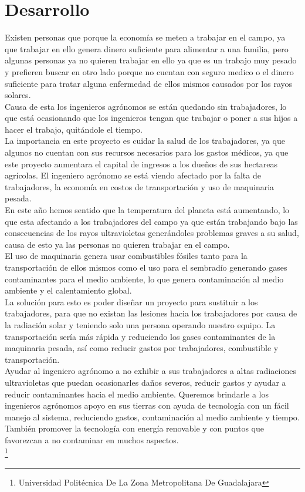 \documentclass[11pt,a4paper]{article}
\begin{document}
\section{Desarrollo}
Existen personas que porque la economía se meten a trabajar en el campo, ya que trabajar en ello genera dinero suficiente para alimentar a una familia, pero algunas personas ya no quieren trabajar en ello ya que es un trabajo muy pesado y prefieren buscar en otro lado porque no cuentan con seguro medico o el dinero suficiente para tratar alguna enfermedad de ellos mismos causados por los rayos solares.\\
Causa de esta los ingenieros agrónomos se están quedando sin trabajadores, lo que está ocasionando que los ingenieros tengan que trabajar o poner a sus hijos a hacer el trabajo, quitándole el tiempo.\\
La importancia en este proyecto es cuidar la salud de los trabajadores, ya que algunos no cuentan con sus recursos necesarios para los gastos médicos, ya que este proyecto aumentara el capital de ingresos a los dueños de sus hectareas agrícolas. El ingeniero agrónomo se está viendo afectado por la falta de trabajadores, la economía en costos de transportación y uso de maquinaria pesada.\\
En este año hemos sentido que la temperatura del planeta está aumentando, lo que esta afectando a los trabajadores del campo ya que están trabajando bajo las consecuencias de los rayos ultravioletas generándoles problemas graves a su salud, causa de esto ya las personas no quieren trabajar en el campo.\\
El uso de maquinaria genera usar combustibles fósiles tanto para la transportación de ellos mismos como el uso para el sembradío generando gases contaminantes para el medio ambiente, lo que genera contaminación al medio ambiente y el calentamiento global.\\
La solución para esto es poder diseñar un proyecto para sustituir a los trabajadores, para que no existan las lesiones hacia los trabajadores por causa de la radiación solar y teniendo solo una persona operando nuestro equipo. La transportación sería más rápida y reduciendo los gases contaminantes de la maquinaria pesada, así como reducir gastos por trabajadores, combustible y transportación.\\
Ayudar al ingeniero agrónomo a no exhibir a sus trabajadores a altas radiaciones ultravioletas que puedan ocasionarles daños severos, reducir gastos y ayudar a reducir contaminantes hacia el medio ambiente. Queremos brindarle a los ingenieros agrónomos apoyo en sus tierras con ayuda de tecnología con un fácil manejo al sistema, reduciendo gastos, contaminación al medio ambiente y tiempo. También promover la tecnología con energía renovable y con puntos que favorezcan a no contaminar en muchos aspectos.\\
\footnote{Universidad Politécnica De La Zona Metropolitana De Guadalajara}
\end{document}
